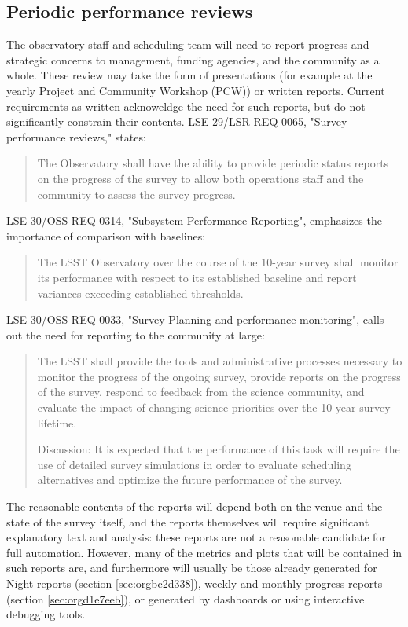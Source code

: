 \subsection{Periodic performance reviews}
\label{sec:org40491d4}
The observatory staff and scheduling team will need to report progress and strategic concerns to management, funding agencies, and the community as a whole.
These review may take the form of presentations (for example at the yearly Project and Community Workshop (PCW)) or written reports.
Current requirements as written acknoweldge the need for such reports, but do not significantly constrain their contents. 
\href{https://ls.st/lse-29}{LSE-29}/LSR-REQ-0065, "Survey performance reviews," states:
\begin{quote}
The Observatory shall have the ability to provide periodic status
reports on the progress of the survey to allow both operations staff
and the community to assess the survey progress.
\end{quote}
\href{https://ls.st/lse-30}{LSE-30}/OSS-REQ-0314, "Subsystem Performance Reporting", emphasizes the importance of comparison with baselines:
\begin{quote}
The LSST Observatory over the course of the 10-year survey shall monitor its performance with respect to its established baseline and report variances exceeding established thresholds.
\end{quote}
\href{https://ls.st/lse-30}{LSE-30}/OSS-REQ-0033, "Survey Planning and performance monitoring", calls out the need for reporting to the community at large:
\begin{quote}
The LSST shall provide the tools and administrative processes
necessary to monitor the progress of the ongoing survey, provide
reports on the progress of the survey, respond to feedback from the
science community, and evaluate the impact of changing science
priorities over the 10 year survey lifetime.

Discussion: It is expected that the performance of this task will
require the use of detailed survey simulations in order to evaluate
scheduling alternatives and optimize the future performance of the
survey.
\end{quote}

The reasonable contents of the reports will depend both on the venue and the state of the survey itself, and the reports themselves will require significant explanatory text and analysis: these reports are not a reasonable candidate for full automation.
However, many of the metrics and plots that will be contained in such reports are, and furthermore will usually be those already generated for Night reports (section \ref{sec:orgbc2d338}), weekly and monthly progress reports (section \ref{sec:orgd1e7eeb}), or generated by dashboards or using interactive debugging tools.

